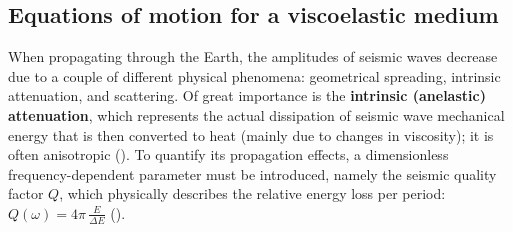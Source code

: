 \subsection{Equations of motion for a viscoelastic medium}
\label{ch:eq_motion_visco}
When propagating through the Earth, the amplitudes of seismic waves decrease due to a couple of different physical phenomena: geometrical spreading, intrinsic attenuation, and scattering. Of great importance is the \textbf{intrinsic (anelastic) attenuation}, which represents the actual dissipation of seismic wave mechanical energy that is then converted to heat (mainly due to changes in viscosity); it is often anisotropic (\cite{Bai:19}). To quantify its propagation effects, a dimensionless frequency-dependent parameter must be introduced, namely the seismic quality factor $Q$, which physically describes the relative energy loss per period: $Q(\omega) = 4\pi\,\frac{E}{\Delta E}$ (\cite{oconnell:78}). 

